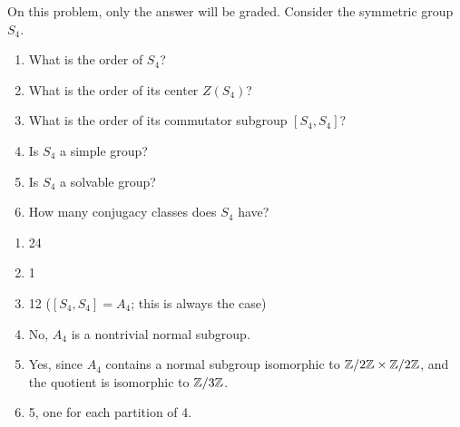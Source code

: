 %
\begin{question}[subtitle = January 2022 Problem 1,ID=Jan22_1]
On this problem, only the answer will be graded. Consider the symmetric group $S_4$.
\begin{enumerate}
    \item What is the order of $S_4$?
    \item What is the order of its center $Z(S_4)$?
    \item What is the order of its commutator subgroup $[S_4, S_4]$?
    \item Is $S_4$ a simple group?
    \item Is $S_4$ a solvable group?
    \item How many conjugacy classes does $S_4$ have?
\end{enumerate}
\end{question}
\begin{solution}
\begin{enumerate}
    \item 24
    \item 1
    \item 12 ($[S_4,S_4]=A_4$; this is always the case)
    \item No, $A_4$ is a nontrivial normal subgroup.
    \item Yes, since $A_4$ contains a normal subgroup isomorphic to $\mathbb{Z}/2\mathbb{Z} \times \mathbb{Z}/2\mathbb{Z}$, and the quotient is isomorphic to $\mathbb{Z}/3\mathbb{Z}$.
    \item 5, one for each partition of 4.
\end{enumerate}
\end{solution}


